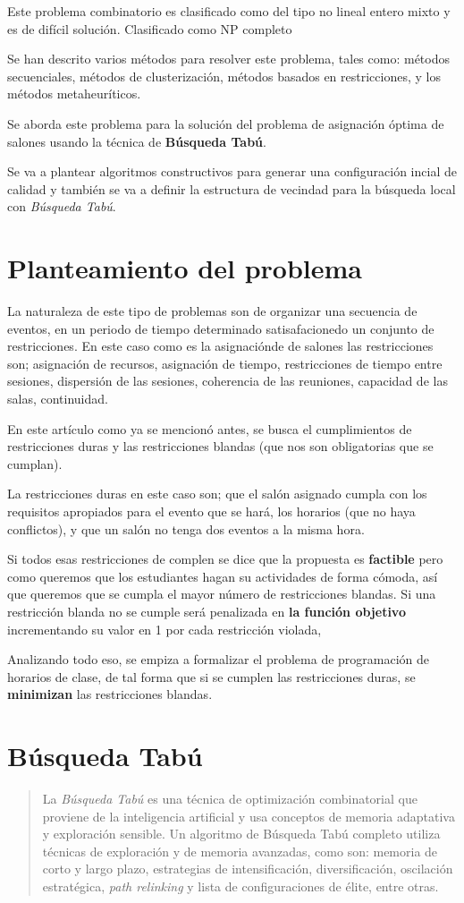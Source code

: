\documentclass[12pt,letterpaper]{article}
\begin{document}
Este problema combinatorio es clasificado como del tipo no lineal entero mixto y es de difícil solución.
Clasificado como NP completo

Se han descrito varios métodos para resolver este problema, tales como: métodos secuenciales, 
métodos de clusterización, métodos basados en restricciones, y los métodos metaheuríticos.

Se aborda este problema para la solución del problema de asignación óptima de salones usando la
técnica de \textbf{Búsqueda Tabú}.

Se va a plantear algoritmos constructivos para generar una configuración incial de calidad y también
se va a definir la estructura de vecindad para la búsqueda local con \textit{Búsqueda Tabú}.

\section{Planteamiento del problema}
La naturaleza de este tipo de problemas son de organizar una secuencia de eventos, en un periodo de tiempo
determinado satisafacionedo un conjunto de restricciones. En este caso como es la asignaciónde de salones
las restricciones son; asignación de recursos, asignación de tiempo, restricciones de tiempo entre sesiones,
dispersión de las sesiones, coherencia de las reuniones, capacidad de las salas, continuidad.

En este artículo como ya se mencionó antes, se busca el cumplimientos de restricciones duras y las restricciones
blandas (que nos son obligatorias que se cumplan).

La restricciones duras en este caso son; que el salón asignado cumpla con los requisitos apropiados para el evento
que se hará, los horarios (que no haya conflictos), y que un salón no tenga dos eventos a la misma hora.

Si todos esas restricciones de complen se dice que la propuesta es \textbf{factible} pero como queremos
que los estudiantes hagan su actividades de forma cómoda, así que queremos que se cumpla el mayor número de
restricciones blandas. Si una restricción blanda no se cumple será penalizada en \textbf{la función objetivo}
incrementando su valor en 1 por cada restricción violada,

Analizando todo eso, se empiza a formalizar el problema de programación de horarios de clase, de tal forma que si
se cumplen las restricciones duras, se \textbf{minimizan} las restricciones blandas.

\section{Búsqueda Tabú}
\blockquote{
La \textit{Búsqueda Tabú} es una técnica de optimización combinatorial que proviene de la inteligencia
artificial y usa conceptos de memoria adaptativa y exploración sensible.
Un algoritmo de Búsqueda Tabú completo utiliza técnicas de exploración y de memoria avanzadas, como son:
memoria de corto y largo plazo, estrategias de intensificación, diversificación, oscilación estratégica,
\textit{path relinking} y lista de configuraciones de élite, entre otras.
}
\end{document}
